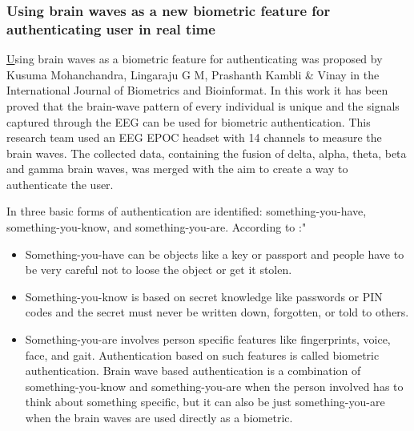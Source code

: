 \subsubsection{Using brain waves as a new biometric feature for authenticating user in real time}
\href{http://www.cscjournals.org/manuscript/Journals/IJBB/volume7/Issue1/IJBB-211.pdf}
Using brain waves as a biometric feature for authenticating was proposed by Kusuma Mohanchandra, Lingaraju G M, Prashanth Kambli \& Vinay in the International Journal of Biometrics and Bioinformat. In this work it has been proved that the brain-wave pattern of every individual is  unique and the signals captured through the  EEG can be used for biometric authentication. This research team used an EEG EPOC headset with 14 channels to measure the brain waves. The collected data, containing the fusion of delta, alpha, theta, beta and gamma brain waves, was merged with the aim to create a way to authenticate the user.

In \cite{kennet} three basic forms of authentication are identified: something-you-have, something-you-know, and something-you-are. According to \cite{kennet}:"
\begin{itemize}
\item Something-you-have can be objects like a key or passport and people have to be very careful not to loose the object or get it stolen.
\item Something-you-know is based on secret knowledge like passwords or PIN codes and the secret must never be written down, forgotten, or told to others.
\item Something-you-are involves person specific features like fingerprints, voice, face, and gait. Authentication based on such features is called biometric authentication. Brain wave based authentication is a combination of something-you-know and something-you-are when the person involved has to think about something specific, but it can also be just something-you-are when the brain waves are used directly as a biometric.
\end{itemize}
 
